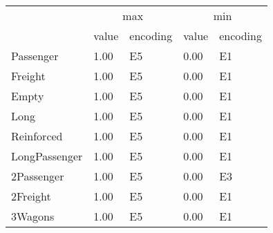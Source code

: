 \begin{tabular}{lllll}
\toprule
 & \multicolumn{2}{c}{max} & \multicolumn{2}{c}{min} \\
 & value & encoding & value & encoding \\
\midrule
Passenger & 1.00 & E5 & 0.00 & E1 \\
Freight & 1.00 & E5 & 0.00 & E1 \\
Empty & 1.00 & E5 & 0.00 & E1 \\
Long & 1.00 & E5 & 0.00 & E1 \\
Reinforced & 1.00 & E5 & 0.00 & E1 \\
LongPassenger & 1.00 & E5 & 0.00 & E1 \\
2Passenger & 1.00 & E5 & 0.00 & E3 \\
2Freight & 1.00 & E5 & 0.00 & E1 \\
3Wagons & 1.00 & E5 & 0.00 & E1 \\
\bottomrule
\end{tabular}
